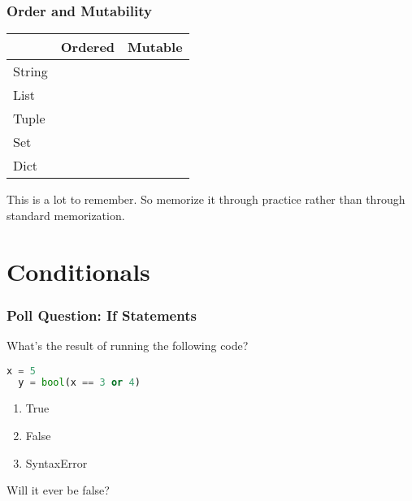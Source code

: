 \documentclass[xcolor=table]{beamer}
\begin{document}
%
%
\begin{frame}[fragile]
  \frametitle{Order and Mutability}
  \begin{table}[]
    \begin{tabular}{l|l|l}
      \hline
      \multicolumn{1}{c|}{}       & \multicolumn{1}{c|}{Ordered}                  & \multicolumn{1}{c}{Mutable}                  \\ \hline
      \multicolumn{1}{c|}{String} & \multicolumn{1}{c|}{\cellcolor[HTML]{34FF34}} & \multicolumn{1}{c}{\cellcolor[HTML]{FE0000}} \\ \hline
      List                        & \cellcolor[HTML]{34FF34}                      & \cellcolor[HTML]{34FF34}                     \\ \hline
      Tuple                       & \cellcolor[HTML]{34FF34}                      & \cellcolor[HTML]{FE0000}                     \\ \hline
      Set                         & \cellcolor[HTML]{FE0000}                      & \cellcolor[HTML]{34FF34}                     \\ \hline
      Dict                        & \cellcolor[HTML]{FE0000}                      & \cellcolor[HTML]{34FF34}                     \\ \hline
    \end{tabular}
  \end{table}
  \pause
  This is a lot to remember. So memorize it through practice rather than through standard memorization. 
\end{frame}


\section{Conditionals}

%
%
\begin{frame}[fragile]
	\frametitle{Poll Question: If Statements}
	What's the result of running the following code?
	\begin{lstlisting}[language=Python, autogobble]
	x = 5
  y = bool(x == 3 or 4)
	\end{lstlisting}
	\vfill
	\begin{enumerate}[A]
		\item True
		\item False
		\item SyntaxError
	\end{enumerate}
	\pause
  Will it ever be false?
\end{frame}
\end{document}
